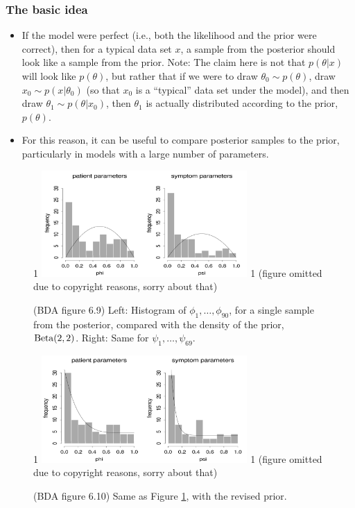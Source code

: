 \documentclass[12pt]{article}
\newcommand{\blind}{1}
\begin{document}
\subsubsection*{The basic idea}
\begin{itemize}
\item If the model were perfect (i.e., both the likelihood and the prior were correct), then for a typical data set $x$, a sample from the posterior should look like a sample from the prior. Note: The claim here is not that $p(\theta | x)$ will look like $p(\theta)$, but rather that if we were to draw $\theta_0\sim p(\theta)$, draw $x_0\sim p(x|\theta_0)$ (so that $x_0$ is a ``typical'' data set under the model), and then draw $\theta_1\sim p(\theta|x_0)$, then $\theta_1$ is actually distributed according to the prior, $p(\theta)$.
\item For this reason, it can be useful to compare posterior samples to the prior, particularly in models with a large number of parameters.
\end{itemize}

\begin{figure}
\begin{center}
\blind {
\includegraphics[width=0.7\textwidth]{psychology-1.png}
} \fi
{}\blind { (figure omitted due to copyright reasons, sorry about that) } \fi
\end{center}
\caption{(BDA figure 6.9) Left: Histogram of $\phi_1,\ldots,\phi_{90}$, for a single sample from the posterior, compared with the density of the prior, $\operatorname*{Beta}(2,2)$. Right: Same for $\psi_1,\ldots,\psi_{69}$.}
\label{figure:psychology-1}
\end{figure}

\begin{figure}
\begin{center}
\blind {
\includegraphics[width=0.7\textwidth]{psychology-2.png}
} \fi
{}\blind { (figure omitted due to copyright reasons, sorry about that) } \fi
\end{center}
\caption{(BDA figure 6.10) Same as Figure \ref{figure:psychology-1}, with the revised prior.}
\label{figure:psychology-2}
\end{figure}
\end{document}
